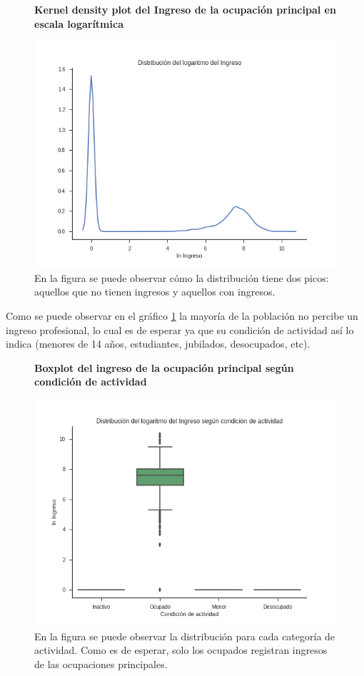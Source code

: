 \begin{figure}[!htb]
	\centering
	\textbf{Kernel density plot del Ingreso de la ocupación principal en escala logarítmica}\par\medskip
	\includegraphics[scale = 0.5]{../img/capitulo3/kdePlotIngreso1.png}
	\caption{En la figura se puede observar cómo la distribución tiene dos picos: aquellos que no tienen ingresos y aquellos con ingresos.}
\end{figure}

Como se puede observar en el gráfico \ref{fig:kdePlotIngreso2} la mayoría de la población no percibe un ingreso profesional, lo cual es de esperar ya que su condición de actividad así lo indica (menores de 14 años, estudiantes, jubilados, desocupados, etc). 

\begin{figure}[!htb]
	\centering
	\textbf{Boxplot del ingreso de la ocupación principal según condición de actividad}\par\medskip
	\includegraphics[scale = 0.5]{../img/capitulo3/kdePlotIngreso2.png}
	\caption{En la figura se puede observar la distribución para cada categoría de actividad. Como es de esperar, solo los ocupados registran ingresos de las ocupaciones principales.}
	\label{fig:kdePlotIngreso2}
\end{figure}


